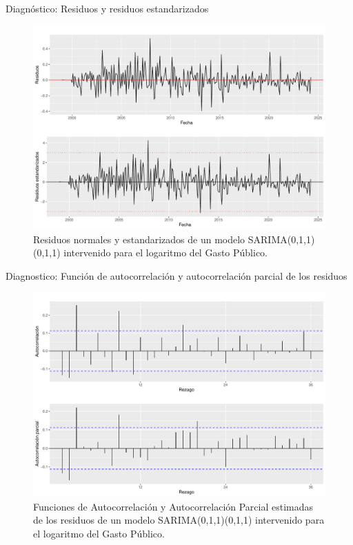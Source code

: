 \documentclass[
  ignorenonframetext,
]{beamer}
\begin{document}
\begin{frame}{Diagnóstico: Residuos y residuos estandarizados}
\protect\hypertarget{diagnuxf3stico-residuos-y-residuos-estandarizados-1}{}
\begin{figure}[H]

{\centering \includegraphics[width=0.85\linewidth]{presentacion_files/figure-beamer/unnamed-chunk-15-1} 

}

\caption{\label{residuos4} Residuos normales y estandarizados de un modelo SARIMA(0,1,1)(0,1,1) intervenido para el logaritmo del Gasto Público.}\label{fig:unnamed-chunk-15}
\end{figure}
\end{frame}

\begin{frame}{Diagnostico: Función de autocorrelación y autocorrelación
parcial de los residuos}
\protect\hypertarget{diagnostico-funciuxf3n-de-autocorrelaciuxf3n-y-autocorrelaciuxf3n-parcial-de-los-residuos}{}
\begin{figure}[H]

{\centering \includegraphics[width=0.75\linewidth]{presentacion_files/figure-beamer/unnamed-chunk-16-1} 

}

\caption{\label{facyp_r4} Funciones de Autocorrelación y Autocorrelación Parcial estimadas de los residuos de un modelo SARIMA(0,1,1)(0,1,1) intervenido para el logaritmo del Gasto Público.}\label{fig:unnamed-chunk-16}
\end{figure}
\end{frame}
\end{document}
